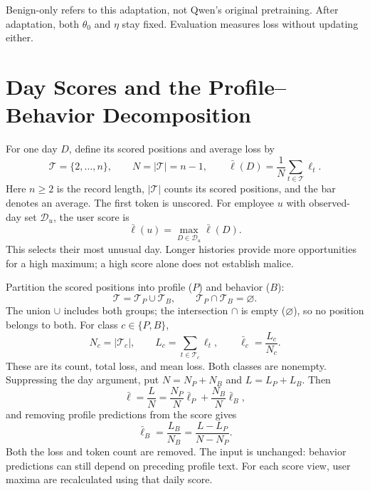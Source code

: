 \documentclass[12pt]{report}
\begin{document}
Benign-only refers to this adaptation, not Qwen's original pretraining.
After adaptation, both $\theta_0$ and $\eta$ stay fixed. Evaluation
measures loss without updating either.

\section{Day Scores and the Profile--Behavior Decomposition}
\label{sec:lm-score}
For one day $D$, define its scored positions and average loss by
\begin{equation}
\mathcal T=\{2,\ldots,n\},\qquad N=|\mathcal T|=n-1,\qquad
\bar\ell(D)=\frac1N\sum_{t\in\mathcal T}\ell_t.
\label{eq:lm-day-score}
\end{equation}
Here $n\geq2$ is the record length, $|\mathcal T|$ counts its scored
positions, and the bar denotes an average. The first token is unscored.
For employee $u$ with observed-day set $\mathcal D_u$, the user score is
\begin{equation}
\bar\ell(u)=\max_{D\in\mathcal D_u}\bar\ell(D).
\label{eq:lm-user-score}
\end{equation}
This selects their most unusual day. Longer histories provide more
opportunities for a high maximum; a high score alone does not establish malice.

\label{sec:lm-decomp}
Partition the scored positions into profile ($P$) and behavior ($B$):
\[
\mathcal T=\mathcal T_P\cup\mathcal T_B,\qquad
\mathcal T_P\cap\mathcal T_B=\varnothing.
\]
The union $\cup$ includes both groups; the intersection $\cap$ is empty
($\varnothing$), so no position belongs to both. For class $c\in\{P,B\}$,
\[
N_c=|\mathcal T_c|,\qquad
L_c=\sum_{t\in\mathcal T_c}\ell_t,\qquad
\bar\ell_c=\frac{L_c}{N_c}.
\]
These are its count, total loss, and mean loss. Both classes are nonempty.
Suppressing the day argument, put $N=N_P+N_B$ and $L=L_P+L_B$. Then
\begin{equation}
\bar\ell=\frac{L}{N}
        =\frac{N_P}{N}\bar\ell_P+\frac{N_B}{N}\bar\ell_B,
\label{eq:lm-decomp}
\end{equation}
and removing profile predictions from the score gives
\begin{equation}
\bar\ell_B=\frac{L_B}{N_B}=\frac{L-L_P}{N-N_P}.
\label{eq:lm-behavior}
\end{equation}
Both the loss and token count are removed. The input is unchanged:
behavior predictions can still depend on preceding profile text.
For each score view, user maxima are recalculated using that daily score.
\end{document}
